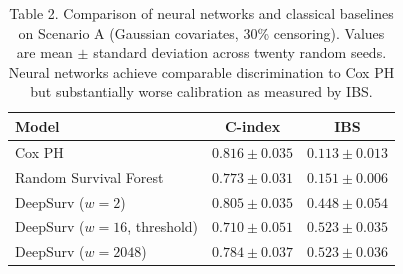 \documentclass[12pt]{article}
\begin{document}
\begin{table}[ht]
\centering
\caption{Table 2. Comparison of neural networks and classical baselines on Scenario A (Gaussian covariates, 30\% censoring). Values are mean $\pm$ standard deviation across twenty random seeds. Neural networks achieve comparable discrimination to Cox PH but substantially worse calibration as measured by IBS.}
\label{tab:baselines}
\begin{tabular}{lcc}
\toprule
\textbf{Model} & \textbf{C-index} & \textbf{IBS} \\
\midrule
Cox PH & $0.816 \pm 0.035$ & $0.113 \pm 0.013$ \\
Random Survival Forest & $0.773 \pm 0.031$ & $0.151 \pm 0.006$ \\
\midrule
DeepSurv ($w=2$) & $0.805 \pm 0.035$ & $0.448 \pm 0.054$ \\
DeepSurv ($w=16$, threshold) & $0.710 \pm 0.051$ & $0.523 \pm 0.035$ \\
DeepSurv ($w=2048$) & $0.784 \pm 0.037$ & $0.523 \pm 0.036$ \\
\bottomrule
\end{tabular}
\end{table}
\end{document}
